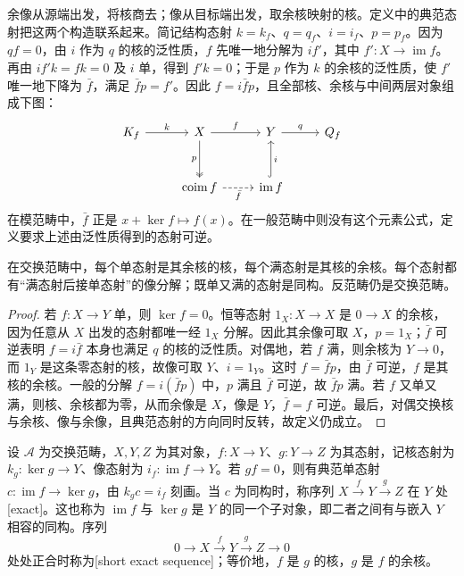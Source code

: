 余像从源端出发，将核商去；像从目标端出发，取余核映射的核。定义中的典范态射把这两个构造联系起来。简记结构态射 \(k=k_f\)、\(q=q_f\)、\(i=i_f\)、\(p=p_f\)。因为 \(qf=0\)，由 \(i\) 作为 \(q\) 的核的泛性质，\(f\) 先唯一地分解为 \(if'\)，其中 \(f':X\to\operatorname{im}f\)。再由 \(if'k=fk=0\) 及 \(i\) 单，得到 \(f'k=0\)；于是 \(p\) 作为 \(k\) 的余核的泛性质，使 \(f'\) 唯一地下降为 \(\bar f\)，满足 \(\bar f p=f'\)。因此 \(f=i\bar f p\)，且全部核、余核与中间两层对象组成下图：
\[
	\begin{tikzcd}[column sep=2.5em,row sep=large]
		K_f\arrow[r,"k"]&X\arrow[r,"f"]\arrow[d,two heads,"p"']&Y\arrow[r,"q"]&Q_f\\
		&\operatorname{coim}f\arrow[r,dashed,"\bar f"']&\operatorname{im}f\arrow[u,hook,"i"']&
	\end{tikzcd}
\]
在模范畴中，\(\bar f\) 正是 \(x+\ker f\mapsto f(x)\)。在一般范畴中则没有这个元素公式，定义要求上述由泛性质得到的态射可逆。

\begin{proposition}\label{b4:prop:abelian-normal-factorization}
	在交换范畴中，每个单态射是其余核的核，每个满态射是其核的余核。每个态射都有“满态射后接单态射”的像分解；既单又满的态射是同构。反范畴仍是交换范畴。
\end{proposition}
\begin{proof}
	若 \(f:X\to Y\) 单，则 \(\ker f=0\)。恒等态射 \(1_X:X\to X\) 是 \(0\to X\) 的余核，因为任意从 \(X\) 出发的态射都唯一经 \(1_X\) 分解。因此其余像可取 \(X\)，\(p=1_X\)；\(\bar f\) 可逆表明 \(f=i\bar f\) 本身也满足 \(q\) 的核的泛性质。对偶地，若 \(f\) 满，则余核为 \(Y\to0\)，而 \(1_Y\) 是这条零态射的核，故像可取 \(Y\)、\(i=1_Y\)。这时 \(f=\bar f p\)，由 \(\bar f\) 可逆，\(f\) 是其核的余核。一般的分解 \(f=i(\bar f p)\) 中，\(p\) 满且 \(\bar f\) 可逆，故 \(\bar f p\) 满。若 \(f\) 又单又满，则核、余核都为零，从而余像是 \(X\)，像是 \(Y\)，\(\bar f=f\) 可逆。最后，对偶交换核与余核、像与余像，且典范态射的方向同时反转，故定义仍成立。
\end{proof}

\begin{definition}\label{b4:def:exact-sequence-abelian}
	设 \(\mathcal A\) 为交换范畴，\(X,Y,Z\) 为其对象，\(f:X\to Y\)、\(g:Y\to Z\) 为其态射，记核态射为 \(k_g:\ker g\to Y\)、像态射为 \(i_f:\operatorname{im}f\to Y\)。若 \(gf=0\)，则有典范单态射 \(c:\operatorname{im}f\to\ker g\)，由 \(k_gc=i_f\) 刻画。当 \(c\) 为同构时，称序列 \(X\xrightarrow fY\xrightarrow gZ\) 在 \(Y\) 处[exact]。这也称为 \(\operatorname{im}f\) 与 \(\ker g\) 是 \(Y\) 的同一个子对象，即二者之间有与嵌入 \(Y\) 相容的同构。序列
	\[
		0\longrightarrow X\xrightarrow fY\xrightarrow gZ\longrightarrow0
	\]
	处处正合时称为[short exact sequence]；等价地，\(f\) 是 \(g\) 的核，\(g\) 是 \(f\) 的余核。
\end{definition}

